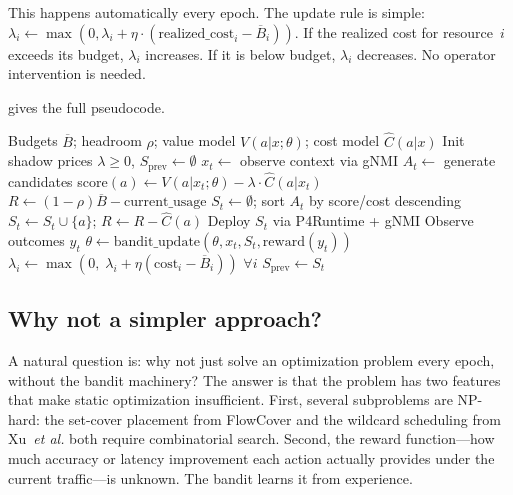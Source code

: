 \documentclass[letterpaper,twocolumn,10pt]{article}
\newcommand{\etal}{\textit{et al.}\xspace}
\begin{document}
This happens automatically every epoch. The update rule is
simple: $\lambda_i \leftarrow \max(0, \lambda_i + \eta \cdot
(\text{realized\_cost}_i - \overline{B}_i))$. If the realized
cost for resource~$i$ exceeds its budget, $\lambda_i$ increases.
If it is below budget, $\lambda_i$ decreases. No operator
intervention is needed.

 gives the full pseudocode.

\begin{algorithm}[t]
  \caption{MCP-RT: Real-time measurement allocation}
  \label{alg:mcprt}
  \begin{algorithmic}[1]
    \REQUIRE Budgets $\overline{B}$; headroom $\rho$;
      value model $V(a|x;\theta)$; cost model $\hat{C}(a|x)$
    \STATE Init shadow prices $\lambda \geq 0$,\;
      $S_{\text{prev}} \leftarrow \emptyset$
      \STATE $x_t \leftarrow$ observe context via gNMI
      \STATE $A_t \leftarrow$ generate candidates
        \STATE score$(a) \leftarrow V(a|x_t;\theta)
          - \lambda \cdot \hat{C}(a|x_t)$
      \ENDFOR
      \STATE $R \leftarrow (1{-}\rho)\overline{B}
        - \text{current\_usage}$
      \STATE $S_t \leftarrow \emptyset$;\;
        sort $A_t$ by score/cost descending
          \STATE $S_t \leftarrow S_t \cup \{a\}$;\;
            $R \leftarrow R - \hat{C}(a)$
        \ENDIF
      \ENDFOR
      \STATE Deploy $S_t$ via P4Runtime + gNMI
      \STATE Observe outcomes $y_t$
      \STATE $\theta \leftarrow \text{bandit\_update}(\theta,
        x_t, S_t, \text{reward}(y_t))$
      \STATE $\lambda_i \leftarrow \max(0,\;
        \lambda_i + \eta(\text{cost}_i - \overline{B}_i))$
        \quad $\forall i$
      \STATE $S_{\text{prev}} \leftarrow S_t$
    \ENDFOR
  \end{algorithmic}
\end{algorithm}

\subsection{Why not a simpler approach?}

A natural question is: why not just solve an optimization problem
every epoch, without the bandit machinery? The answer is that the
problem has two features that make static optimization
insufficient. First, several subproblems are NP-hard: the
set-cover placement from FlowCover and the wildcard scheduling
from Xu~\etal both require combinatorial search. Second, the
reward function---how much accuracy or latency improvement each
action actually provides under the current traffic---is unknown.
The bandit learns it from experience.
\end{document}
